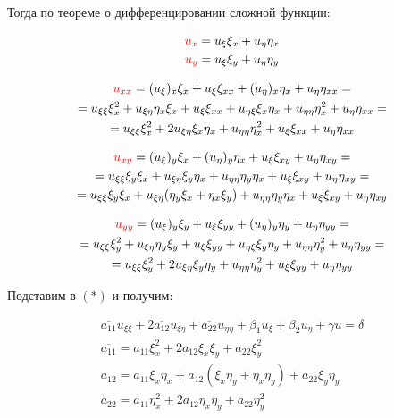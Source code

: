 Тогда по теореме о дифференцировании сложной функции:

$$\begin{gathered}
	\text{\textbf{\color{red}$u_x$}} = u_{\xi} \xi_x + u_{\eta} \eta_x \\ \text{\textbf{\color{red}$u_y$}} = u_{\xi} \xi_y + u_{\eta} \eta_y
\end{gathered}$$

$$\begin{gathered}
	\text{\textbf{\color{red}$u_{xx}$}} = (u_{\xi})_x \xi_x + u_{\xi} \xi_{xx} + (u_{\eta})_x \eta_x + u_{\eta} \eta_{xx} = 
	\\ 
	= u_{\xi \xi} \xi_x^2 + u_{\xi \eta} \eta_x \xi_x + u_{\xi} \xi_{xx} + u_{\eta \xi} \xi_x \eta_x + u_{\eta \eta} \eta_x^2 + u_{\eta} \eta_{xx} = 
	\\ 
	= u_{\xi \xi} \xi_x^2 + 2 u_{\xi \eta} \xi_x \eta_x + u_{\eta \eta} \eta_x^2 + u_{\xi} \xi_{xx} + u_{\eta} \eta_{xx}
\end{gathered}$$

$$\begin{gathered}
	\text{\textbf{\color{red}$u_{xy}$}} = (u_{\xi})_y \xi_x + (u_{\eta})_y \eta_x + u_{\xi} \xi_{x y} + u_{\eta} \eta_{x y} = 
	\\
	= u_{\xi \xi} \xi_y \xi_x + u_{\xi \eta} \xi_y \eta_x + u_{\eta \eta} \eta_y \eta_x + u_{\xi} \xi_{xy} + u_{\eta} \eta_{xy} =
	\\
	= u_{\xi \xi} \xi_y \xi_x + u_{\xi \eta} (\eta_y \xi_x + \eta_x \xi_y) + u_{\eta \eta} \eta_y \eta_x + u_{\xi} \xi_{xy} + u_{\eta} \eta_{xy}
\end{gathered}$$

$$\begin{gathered}
	\text{\textbf{\color{red}$u_{yy}$}} = (u_{\xi})_y \xi_y + u_{\xi} \xi_{yy} + (u_{\eta})_y \eta_y + u_{\eta} \eta_{yy} = 
	\\ 
	= u_{\xi \xi} \xi_y^2 + u_{\xi \eta} \eta_y \xi_y + u_{\xi} \xi_{yy} + u_{\eta \xi} \xi_y \eta_y + u_{\eta \eta} \eta_y^2 + u_{\eta} \eta_{yy} = 
	\\ 
	= u_{\xi \xi} \xi_y^2 + 2 u_{\xi \eta} \xi_y \eta_y + u_{\eta \eta} \eta_y^2 + u_{\xi} \xi_{yy} + u_{\eta} \eta_{yy}
\end{gathered}$$

Подставим в $(*)$ и получим:

$$\begin{gathered}
	\overline{a_{11}} u_{\xi \xi} + 2 \overline{a_{12}} u_{\xi \eta} + \overline{a_{22}} u_{\eta \eta} + \beta_1 u_{\xi} + \beta_2 u_{\eta} + \gamma u = \delta
	\\
	\overline{a_{11}} = a_{11} \xi_x^2 + 2 a_{12} \xi_x \xi_y + a_{22} \xi_y^2
	\\
	\overline{a_{12}} = a_{11} \xi_x \eta_x + a_{12} (\xi_x \eta_y + \eta_x \eta_y) + a_{22} \xi_y \eta_y
	\\
	\overline{a_{22}} = a_{11} \eta_x^2 + 2 a_{12} \eta_x \eta_y + a_{22} \eta_y^2
\end{gathered}$$

